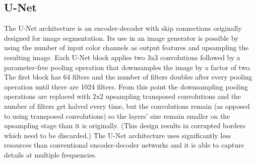 \subsection{U-Net}
The U-Net architecture is an encoder-decoder with skip connections originally designed for image segmentation. Its use in an image generator is possible by using the number of input color channels as output features and upsampling the resulting image. Each U-Net block applies two 3x3 convolutions followed by a parameter-free pooling operation that downsamples the image by a factor of two. The first block has 64 filters and the number of filters doubles after every pooling operation until there are 1024 filters. From this point the downsampling pooling operations are replaced with 2x2 upsampling transposed convolutions and the number of filters get halved every time, but the convolutions remain (as opposed to using transposed convolutions) so the layers' size remain smaller on the upsampling stage than it is originally. (This design results in corrupted borders which need to be discarded.) The U-Net architecture uses significantly less resources than conventional encoder-decoder networks and it is able to capture details at multiple frequencies.
